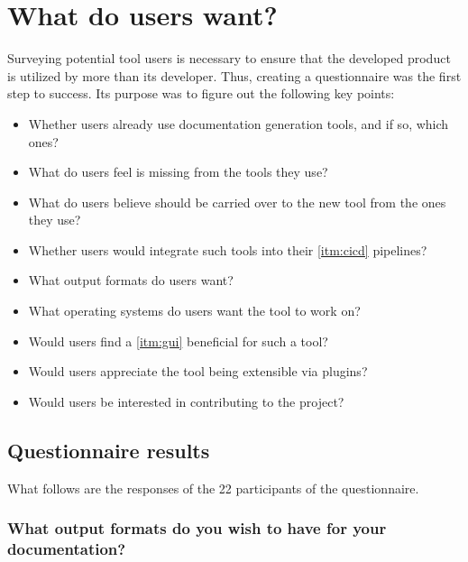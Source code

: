 \section{What do users want?} \label{sec:whatdouserswant}
Surveying potential tool users is necessary to ensure that the developed product is utilized by more than its developer.
Thus, creating a questionnaire was the first step to success. Its purpose was to figure out the following key points:
\begin{itemize}
    \item Whether users already use documentation generation tools, and if so, which ones?
    \item What do users feel is missing from the tools they use?
    \item What do users believe should be carried over to the new tool from the ones they use?
    \item Whether users would integrate such tools into their \ref{itm:cicd} pipelines?
    \item What output formats do users want?
    \item What operating systems do users want the tool to work on?
    \item Would users find a \ref{itm:gui} beneficial for such a tool?
    \item Would users appreciate the tool being extensible via plugins?
    \item Would users be interested in contributing to the project?
\end{itemize}

\subsection{Questionnaire results}

What follows are the responses of the 22 participants of the questionnaire.

\subsubsection*{What output formats do you wish to have for your documentation?}

